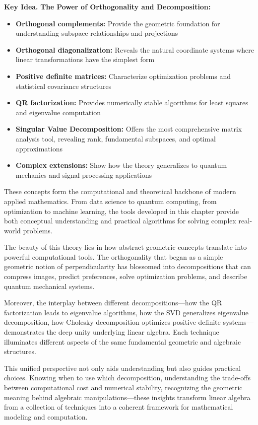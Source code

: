 \documentclass[12pt]{article}
\numberwithin{equation}{section}
\theoremstyle{plain}
\theoremstyle{definition}
\theoremstyle{remark}
\newenvironment{keyidea}{\begin{tcolorbox}\textbf{Key Idea.}}{\end{tcolorbox}}
\begin{document}
\begin{keyidea}
\textbf{The Power of Orthogonality and Decomposition:}

\begin{itemize}
\item \textbf{Orthogonal complements:} Provide the geometric foundation for understanding subspace relationships and projections
\item \textbf{Orthogonal diagonalization:} Reveals the natural coordinate systems where linear transformations have the simplest form
\item \textbf{Positive definite matrices:} Characterize optimization problems and statistical covariance structures
\item \textbf{QR factorization:} Provides numerically stable algorithms for least squares and eigenvalue computation
\item \textbf{Singular Value Decomposition:} Offers the most comprehensive matrix analysis tool, revealing rank, fundamental subspaces, and optimal approximations
\item \textbf{Complex extensions:} Show how the theory generalizes to quantum mechanics and signal processing applications
\end{itemize}

These concepts form the computational and theoretical backbone of modern applied mathematics. From data science to quantum computing, from optimization to machine learning, the tools developed in this chapter provide both conceptual understanding and practical algorithms for solving complex real-world problems.

The beauty of this theory lies in how abstract geometric concepts translate into powerful computational tools. The orthogonality that began as a simple geometric notion of perpendicularity has blossomed into decompositions that can compress images, predict preferences, solve optimization problems, and describe quantum mechanical systems.

Moreover, the interplay between different decompositions—how the QR factorization leads to eigenvalue algorithms, how the SVD generalizes eigenvalue decomposition, how Cholesky decomposition optimizes positive definite systems—demonstrates the deep unity underlying linear algebra. Each technique illuminates different aspects of the same fundamental geometric and algebraic structures.

This unified perspective not only aids understanding but also guides practical choices. Knowing when to use which decomposition, understanding the trade-offs between computational cost and numerical stability, recognizing the geometric meaning behind algebraic manipulations—these insights transform linear algebra from a collection of techniques into a coherent framework for mathematical modeling and computation.
\end{keyidea}
\end{document}
